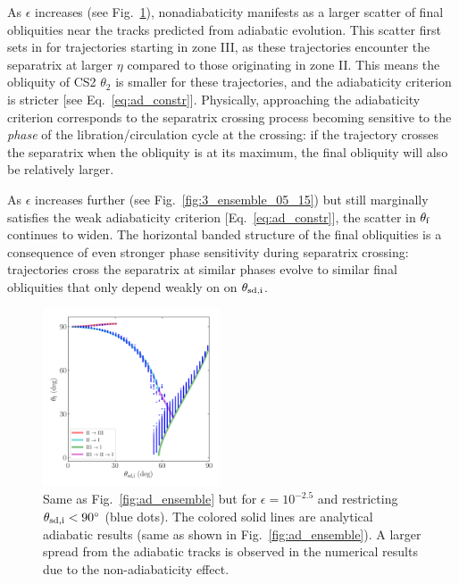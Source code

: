 \documentclass[twocolumn,twocolappendix]{aastex63}
\begin{document}
As $\epsilon$ increases (see Fig.~\ref{fig:3_ensemble_05_25}), nonadiabaticity
manifests as a larger scatter of final obliquities near the tracks predicted
from adiabatic evolution. This scatter first sets in for trajectories starting
in zone III, as these trajectories encounter the separatrix at larger $\eta$
compared to those originating in zone II\@. This means the obliquity of CS2
$\theta_2$ is smaller for these trajectories, and the adiabaticity criterion is
stricter [see Eq.~\eqref{eq:ad_constr}]. Physically, approaching the
adiabaticity criterion corresponds to the separatrix crossing process becoming
sensitive to the \emph{phase} of the libration/circulation cycle at the
crossing: if the trajectory crosses the separatrix when the obliquity is at its
maximum, the final obliquity will also be relatively larger.

As $\epsilon$ increases further (see Fig.~\ref{fig:3_ensemble_05_15}) but still
marginally satisfies the weak adiabaticity criterion [Eq.~\eqref{eq:ad_constr}],
the scatter in $\theta_{\rm f}$ continues to widen. The horizontal banded
structure of the final obliquities is a consequence of even stronger phase
sensitivity during separatrix crossing: trajectories cross the separatrix at
similar phases evolve to similar final obliquities that only depend weakly on
on $\theta_{\rm sd, i}$.

\begin{figure}
    \centering
    \includegraphics[width=0.47\textwidth]{plots_diskdisp/3_ensemble_05_25.png}
    \caption{Same as Fig.~\ref{fig:ad_ensemble} but for $\epsilon = 10^{-2.5}$
    and restricting $\theta_{\rm sd, i} < 90^\circ$ (blue dots). The colored
    solid lines are analytical adiabatic results (same as shown in
    Fig.~\ref{fig:ad_ensemble}). A larger spread from the adiabatic tracks is
    observed in the numerical results due to the non-adiabaticity effect.
    }\label{fig:3_ensemble_05_25}
\end{figure}
\end{document}
